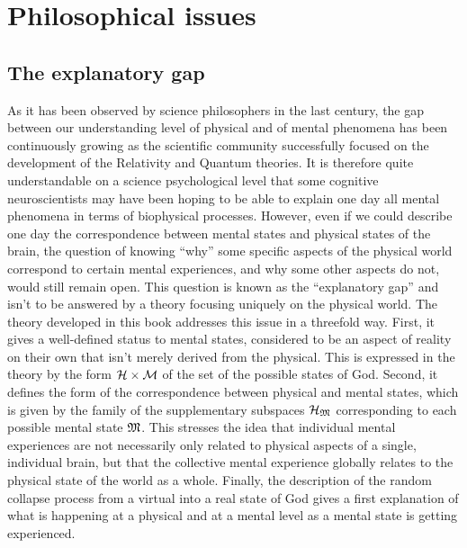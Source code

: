 \documentclass[10pt,a4paper,twoside,openany]{book}
\begin{document}

\chapter{Philosophical issues}
\label{Philosophical issues}

\section{The explanatory gap}

As it has been observed by science philosophers in the last century, the gap between our understanding level of physical and of mental phenomena has been continuously growing as the scientific community successfully focused on the development of the Relativity and Quantum theories. It is therefore quite understandable on a science psychological level that some cognitive neuroscientists may have been hoping to be able to explain one day all mental phenomena in terms of biophysical processes. However, even if we could describe one day the correspondence between mental states and physical states of the brain, the question of knowing ``why'' some specific aspects of the physical world correspond to certain mental experiences, and why some other aspects do not, would still remain open. This question is known as the ``explanatory gap'' and isn't to be answered by a theory focusing uniquely on the physical world. The theory developed in this book addresses this issue in a threefold way. First, it gives a well-defined status to mental states, considered to be an aspect of reality on their own that isn't merely derived from the physical. This is expressed in the theory by the form  $\mathcal H \times \mathcal M$ of the set of the possible states of God. Second, it defines the form of the correspondence between physical and mental states, which is given by the family of the supplementary subspaces $\mathcal H_{\mathfrak{M}}$ corresponding to each possible mental state $\mathfrak{M}$. This stresses the idea that individual mental experiences are not necessarily only related to physical aspects of a single, individual brain, but that the collective mental experience globally relates to the physical state of the world as a whole. Finally, the description of the random collapse process from a virtual into a real state of God gives a first explanation of what is happening at a physical and at a mental level as a mental state is getting experienced.
\end{document}
